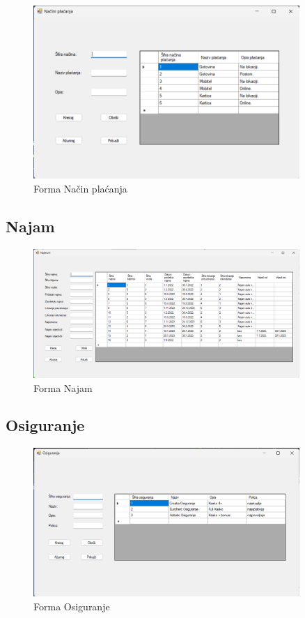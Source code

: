 \documentclass[]{foi} %
\begin{document}
\begin{figure}[!ht]
    \centering
    \includegraphics[width=0.9\textwidth]{slike/nacin.png}
    \caption{Forma Način plaćanja}
    \label{fig:nacin}
\end{figure}

\subsection{Najam}
\label{sec:najam}

\begin{figure}[!ht]
    \centering
    \includegraphics[width=0.9\textwidth]{slike/najam.png}
    \caption{Forma Najam}
    \label{fig:najam}
\end{figure}
\newpage

\subsection{Osiguranje}

\begin{figure}[!ht]
    \centering
    \includegraphics[width=0.9\textwidth]{slike/osiguranje.png}
    \caption{Forma Osiguranje}
    \label{fig:osiguranje}
\end{figure}
\end{document}
